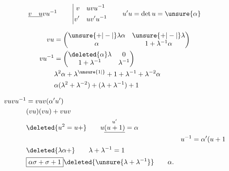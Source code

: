 \[
\underline{v\quad u}vu^{-1}\qquad\left|\begin{aligned}v&\quad uvu^{-1}\\v'&\quad uv'u^{-1}\end{aligned}\right.
\qquad u'u=\det u=\unsure{\alpha}
\]

\[
\begin{aligned}
vu&=\begin{pmatrix}\unsure{+|-|{}}\lambda\alpha&\unsure{+|-|{}}\lambda\\\alpha&1+\lambda^{-1}\alpha\end{pmatrix}\\
vu^{-1}&=\begin{pmatrix}\deleted{\alpha}\lambda&0\\1+\lambda^{-1}&\lambda^{-1}\end{pmatrix}\\
&\lambda^2\alpha+\lambda^{\unsure{1|{}}}+1+\lambda^{-1}+\lambda^{-2}\alpha\\
&\alpha(\lambda^2+\lambda^{-2})+(\lambda+\lambda^{-1})+1
\end{aligned}
\]

\[
\begin{aligned}
vuvu^{-1}&=vuv(\alpha'u')\\
&(vu)(vu)+vuv\\
&\deleted{u^2=u+}\qquad u\overset{u'}{\underline{(u+1)}}=\alpha\\
&&u^{-1}=\alpha'(u+1\\
&\deleted{\lambda\alpha+}\qquad\lambda+\lambda^{-1}=1\\
&\boxed{\alpha\sigma+\sigma+1}\deleted{\unsure{\lambda+\lambda^{-1}}}\qquad\alpha.
\end{aligned}
\]

